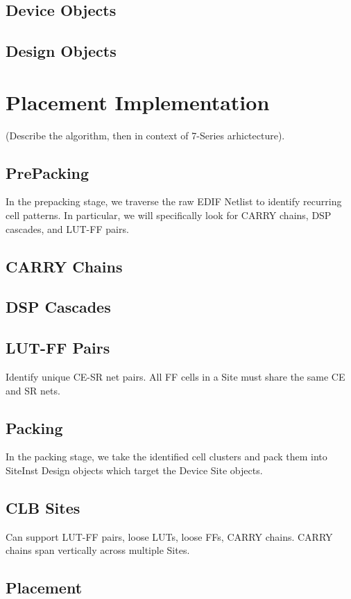 \documentclass{article}
\begin{document}
\begin{multicols}{2}
    \subsection{Device Objects}
    \subsection{Design Objects}


\section{Placement Implementation}
    (Describe the algorithm, then in context of 7-Series arhictecture). \\
    \subsection{PrePacking}
        In the prepacking stage, we traverse the raw EDIF Netlist to identify recurring cell patterns. In particular, we will specifically look for CARRY chains, DSP cascades, and LUT-FF pairs.
        \subsection{CARRY Chains}
        \subsection{DSP Cascades}
        \subsection{LUT-FF Pairs}
            Identify unique CE-SR net pairs. All FF cells in a Site must share the same CE and SR nets.
    \subsection{Packing}
        In the packing stage, we take the identified cell clusters and pack them into SiteInst Design objects which target the Device Site objects.
        \subsection{CLB Sites}
            Can support LUT-FF pairs, loose LUTs, loose FFs, CARRY chains.
            CARRY chains span vertically across multiple Sites.
    \subsection{Placement}






\end{multicols}
\end{document}
